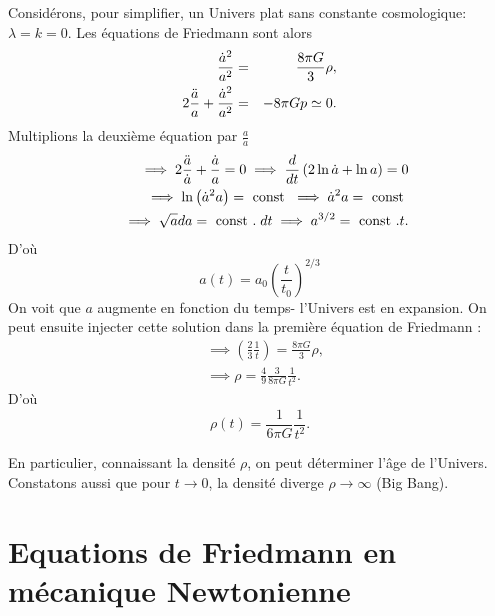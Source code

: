 \documentclass[a4paper,12pt]{report}
\theoremstyle{plain}
\theoremstyle{plain}
\begin{document}
  Consid\'erons, pour simplifier, un Univers plat sans constante cosmologique:  $\lambda = k=0$.
  Les \'equations de Friedmann sont alors 
  \begin{eqnarray}
  \frac{\dot{a}^2}{a^2} & = &\frac{8\pi G}{3} \rho , \cr
  2 \frac{\ddot{a}}{a} + \frac{\dot{a}^2}{a^2} & =&-8 \pi G p\simeq 0. 
  \end{eqnarray}
  Multiplions la deuxi\`eme \'equation par $\frac{a}{\dot{a}}$ 
  \begin{eqnarray}
  && \implies 2 \frac{\ddot{a}}{\dot{a}} + \frac{\dot{a}}{a} =0 \implies \frac{d}{dt}
  \left( 2 \ln \dot{a} + \ln a \right)  =0 \cr
  && \implies \ln \left( \dot{a}^2a \right) = \text{ const } \implies \dot{a}^2a = \text{ const } \cr
  &&\implies \sqrt{a}da = \text{ const } . \; dt \implies a^{3/2} =\text{ const }.t.    
  \end{eqnarray} 
   D'o\`{u} 
   \begin{equation}
   a(t) = a_0 \left( \frac{t}{t_0} \right) ^{2/3}
   \end{equation} 
   On voit que $a$ augmente en fonction du temps- l'Univers est en expansion. On peut ensuite injecter cette solution dans la premi\`ere \'equation de Friedmann : 
   \begin{eqnarray}
   &  \implies \left( \frac{2}{3} \frac{1}{t} \right) = \frac{8\pi G}{3} \rho , \nonumber \\
   & \implies \rho = \frac{4}{9} \frac{3}{8 \pi G} \frac{1}{t^2}.
   \end{eqnarray}
   D'o\`{u} 
   \begin{equation}
   \rho (t) = \frac{1}{6 \pi G} \frac{1}{t^2}.
   \end{equation}
   
   En particulier, connaissant la densit\'e $\rho$, on peut d\'eterminer l'\^{a}ge de l'Univers. Constatons aussi que pour $t \rightarrow 0 $, la densit\'e diverge $\rho \rightarrow \infty $ (Big Bang). 
  
 \section{Equations de Friedmann en m\'ecanique Newtonienne} 
 
\end{document}
